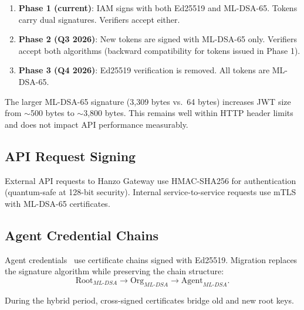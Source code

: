 \begin{enumerate}[leftmargin=1.4em]
    \item \textbf{Phase 1 (current)}: IAM signs with both Ed25519 and ML-DSA-65.
    Tokens carry dual signatures. Verifiers accept either.
    \item \textbf{Phase 2 (Q3 2026)}: New tokens are signed with ML-DSA-65 only.
    Verifiers accept both algorithms (backward compatibility for tokens issued
    in Phase 1).
    \item \textbf{Phase 3 (Q4 2026)}: Ed25519 verification is removed. All
    tokens are ML-DSA-65.
\end{enumerate}

\begin{remark}
The larger ML-DSA-65 signature (3,309 bytes vs.\ 64 bytes) increases JWT size
from $\sim$500 bytes to $\sim$3,800 bytes. This remains well within HTTP header
limits and does not impact API performance measurably.
\end{remark}

\subsection{API Request Signing}

External API requests to Hanzo Gateway use HMAC-SHA256 for authentication
(quantum-safe at 128-bit security). Internal service-to-service requests use
mTLS with ML-DSA-65 certificates.

\subsection{Agent Credential Chains}

Agent credentials~\cite{hanzoagentsdk} use certificate chains signed with
Ed25519. Migration replaces the signature algorithm while preserving the chain
structure:
\begin{equation}
\text{Root}_{ML\text{-}DSA} \to \text{Org}_{ML\text{-}DSA} \to
\text{Agent}_{ML\text{-}DSA}.
\end{equation}

During the hybrid period, cross-signed certificates bridge old and new root
keys.

